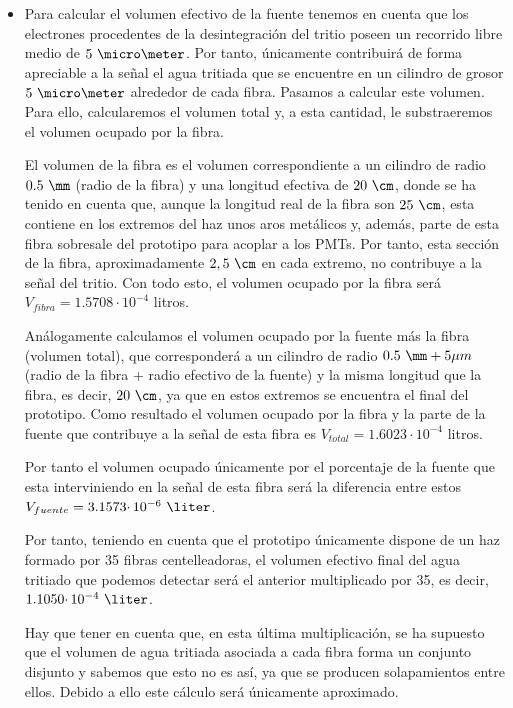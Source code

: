 \begin{itemize}
 \item{} Para calcular el volumen efectivo de la fuente tenemos en cuenta que los electrones procedentes de la desintegración del tritio poseen un recorrido libre medio de $5~\micro\meter$. Por tanto, únicamente contribuirá de forma apreciable a la señal el agua tritiada que se encuentre en  un cilindro de grosor $5~\micro\meter$ alrededor de cada fibra. Pasamos a calcular este volumen. Para ello, calcularemos el volumen total y, a esta cantidad, le substraeremos el volumen ocupado por la fibra.

El volumen de la fibra es el volumen correspondiente a un cilindro de radio $0.5~\mm$ (radio de la fibra) y una longitud efectiva de $20~\cm$, donde se ha tenido en cuenta que, aunque la longitud real de la fibra son $25~\cm$, esta contiene en los extremos del haz unos aros metálicos y, además, parte de esta fibra sobresale del prototipo para acoplar a los PMTs. Por tanto, esta sección de la fibra, aproximadamente $2,5~\cm$ en cada extremo,  no contribuye a la señal del tritio. Con todo esto, el volumen ocupado por la fibra será $V_{fibra}=1.5708 \cdotp 10^{-4}$ litros.

Análogamente calculamos el volumen ocupado por la fuente más la fibra (volumen total), que corresponderá a un cilindro de radio $0.5~\mm+5\mu m$ (radio de la fibra + radio efectivo de la fuente) y la misma longitud que la fibra, es decir, $20~\cm$, ya que en estos extremos se encuentra el final del prototipo. Como resultado el volumen ocupado por la fibra y la parte de la fuente que contribuye a la señal de esta fibra es $V_{total}=1.6023 \cdotp 10^{-4}$ litros. 

Por tanto el volumen ocupado únicamente por el porcentaje de la fuente que esta interviniendo en la señal de esta fibra será la diferencia entre estos $V_{fuente}=3.1573 \cdotp 10^{-6}~\liter$.
 
Por tanto, teniendo en cuenta que el prototipo únicamente dispone de un haz formado por 35 fibras centelleadoras, el volumen efectivo final del agua tritiado que podemos detectar será el anterior multiplicado por 35, es decir, $1.1050 \cdotp 10^{-4}~\liter$. 

Hay que tener en cuenta que, en esta última multiplicación, se ha supuesto que el volumen de agua tritiada asociada a cada fibra forma un conjunto disjunto y sabemos que esto no es así, ya que se producen solapamientos entre ellos. Debido a ello este cálculo será únicamente aproximado.


\end{itemize}
